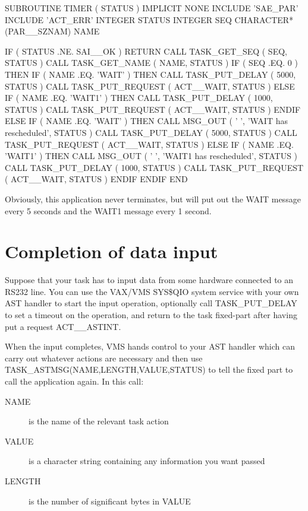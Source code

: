 \documentclass[twoside,11pt,nolof]{starlink}
\begin{document}
\begin{small}
\begin{terminalv}
      SUBROUTINE TIMER ( STATUS )
      IMPLICIT NONE
      INCLUDE 'SAE_PAR'
      INCLUDE 'ACT_ERR'
      INTEGER STATUS
      INTEGER SEQ
      CHARACTER*(PAR__SZNAM) NAME

      IF ( STATUS .NE. SAI__OK ) RETURN
      CALL TASK_GET_SEQ ( SEQ, STATUS )
      CALL TASK_GET_NAME ( NAME, STATUS )
      IF ( SEQ .EQ. 0 ) THEN
         IF ( NAME .EQ. 'WAIT' ) THEN
            CALL TASK_PUT_DELAY ( 5000, STATUS )
            CALL TASK_PUT_REQUEST ( ACT__WAIT, STATUS )
         ELSE IF ( NAME .EQ. 'WAIT1' ) THEN
            CALL TASK_PUT_DELAY ( 1000, STATUS )
            CALL TASK_PUT_REQUEST ( ACT__WAIT, STATUS )
         ENDIF
      ELSE
         IF ( NAME .EQ. 'WAIT' ) THEN
            CALL MSG_OUT ( ' ', 'WAIT has rescheduled', STATUS )
            CALL TASK_PUT_DELAY ( 5000, STATUS )
            CALL TASK_PUT_REQUEST ( ACT__WAIT, STATUS )
         ELSE IF ( NAME .EQ. 'WAIT1' ) THEN
            CALL MSG_OUT ( ' ', 'WAIT1 has rescheduled', STATUS )
            CALL TASK_PUT_DELAY ( 1000, STATUS )
            CALL TASK_PUT_REQUEST ( ACT__WAIT, STATUS )
         ENDIF
      ENDIF
      END
\end{terminalv}
\end{small}

Obviously, this application never terminates, but will put out the WAIT
message every 5 seconds and the WAIT1 message every 1 second.

\section{Completion of data input}

Suppose that your task has to input data from some hardware connected to
an RS232 line. You can use the VAX/VMS SYS\$QIO system service with your
own AST handler to start the input operation, optionally call
TASK\_PUT\_DELAY to set a timeout on the operation, and return
to the task fixed-part after having put a request ACT\_\_ASTINT.

When the input completes, VMS hands control to your AST handler which
can carry out whatever actions are necessary and then use
TASK\_ASTMSG(NAME,LENGTH,VALUE,STATUS) to tell the fixed part to call the
application again. In this call:
\begin{description}
\item[NAME] is the name of the relevant task
action
\item[VALUE] is a character string containing any information you want
passed
\item[LENGTH] is the number of significant bytes in VALUE
\end{description}
\end{document}
